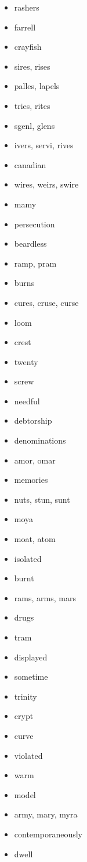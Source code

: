 \documentclass{article}
\begin{document}
\begin{itemize}
    \item rashers
    \item farrell
    \item crayfish
    \item sires, rises
    \item palles, lapels
    \item tries, rites
    \item sgenl, glens
    \item ivers, servi, rives
    \item canadian
    \item wires, weirs, swire
    \item mamy
    \item persecution
    \item beardless
    \item ramp, pram
    \item burns
    \item cures, cruse, curse
    \item loom
    \item crest
    \item twenty
    \item screw
    \item needful
    \item debtorship
    \item denominations
    \item amor, omar
    \item memories
    \item nuts, stun, sunt
    \item moya
    \item moat, atom
    \item isolated
    \item burnt
    \item rams, arms, mars
    \item drugs
    \item tram
    \item displayed
    \item sometime
    \item trinity
    \item crypt
    \item curve
    \item violated
    \item warm
    \item model
    \item army, mary, myra
    \item contemporaneously
    \item dwell

\end{itemize}
\end{document}
